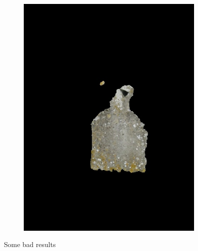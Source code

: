 \documentclass[a4paper,11]{article}
\begin{document}
\begin{center}
\begin{figure}[H]
\begin{subfigure}{.33\textwidth}
    \end{subfigure}
    \begin{subfigure}{0.33\textwidth}
      \centering
      \includegraphics[width=0.9\linewidth]{results/grave}
   \end{subfigure}
    \caption{Some bad results}
  \end{figure}
  \end{center}
\end{document}
